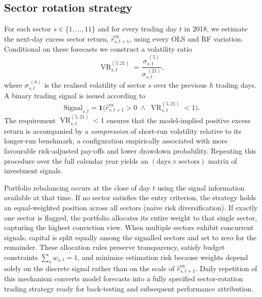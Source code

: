 \subsection{Sector rotation strategy}

For each sector $s\in\{1,\dots,11\}$ and for every trading day $t$ in 2018, we estimate the next-day excess sector return, $\widehat{r}^{\text{ex}}_{s,t+1}$, using every OLS and RF variation. Conditional on these forecasts we construct a volatility ratio%
\[
\operatorname{VR}_{s,t}^{(5,21)}=\frac{\sigma_{s,t}^{\;(5)}}{\sigma_{s,t}^{\;(21)}},
\]
where $\sigma_{s,t}^{\;(h)}$ is the realised volatility of sector $s$ over the previous $h$ trading days.  A binary trading signal is issued according to
\[
\text{Signal}_{s,t}=\mathbf{1}
\!\bigl(
\widehat{r}^{\text{ex}}_{s,t+1}>0
\;\wedge\;
\operatorname{VR}_{s,t}^{(5,21)}<1
\bigr).
\]
The requirement $\operatorname{VR}_{s,t}^{(5,21)}<1$ ensures that the model-implied positive excess return is accompanied by a \emph{compression} of short-run volatility relative to its longer-run benchmark, a configuration empirically associated with more favourable risk-adjusted pay-offs and lower drawdown probability.  Repeating this procedure over the full calendar year yields an $(\text{days}\times\text{sectors})$ matrix of investment signals.


Portfolio rebalancing occurs at the close of day $t$ using the signal information available at that time.  If no sector satisfies the entry criterion, the strategy holds an equal-weighted position across all sectors (naive risk diversification).  If exactly one sector is flagged, the portfolio allocates its entire weight to that single sector, capturing the highest conviction view.  When multiple sectors exhibit concurrent signals, capital is split equally among the signalled sectors and set to zero for the remainder. These allocation rules preserve transparency, satisfy budget constraints $\sum_{s}w_{s,t}=1$, and minimise estimation risk because weights depend solely on the discrete signal rather than on the scale of $\widehat{r}^{\text{ex}}_{s,t+1}$.  Daily repetition of this mechanism converts model forecasts into a fully specified sector-rotation trading strategy ready for back-testing and subsequent performance attribution.


